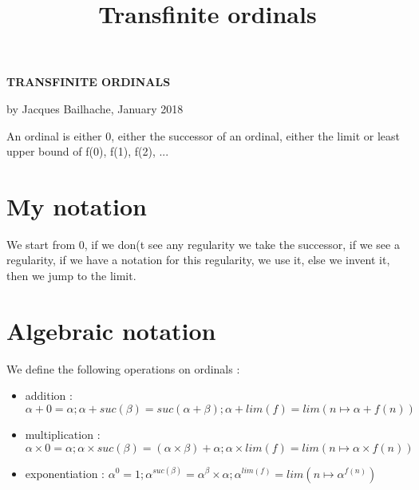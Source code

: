 \documentclass[8pt]{article}
\title{Transfinite ordinals}
\begin{document}
\setlength{\parindent}{0pt}

\vspace{-0.4cm}

\begin{center}
\textbf{TRANSFINITE ORDINALS}

by Jacques Bailhache, January 2018
\end{center}

\vspace{-0.2cm}

An ordinal is either 0, either the successor of an ordinal, either the limit or least upper bound of f(0), f(1), f(2), ...
\vspace{-0.7cm}

\section{My notation}
\vspace{-0.4cm}
We start from 0, if we don(t see any regularity we take the successor, if we see a regularity, if we have a notation for this regularity, we use it, else we invent it, then we jump to the limit.

\vspace{-0.6cm}

\section{Algebraic notation}
\vspace{-0.4cm}
We define the following operations on ordinals :
\vspace{-0.4cm}
\smallskip
\begin{itemize}
     \setlength{\itemsep}{1pt}
     \setlength{\parskip}{0pt}
     \setlength{\parsep}{0pt}
\item addition : \( \alpha+0=\alpha ; \alpha+suc(\beta)=suc(\alpha+\beta); \alpha+lim(f)=lim(n \mapsto \alpha+f(n)) \)
\vspace{-0.1cm}
\item multiplication : \( \alpha \times 0 = \alpha ; \alpha \times suc(\beta) = (\alpha \times \beta) + \alpha ; \alpha \times lim(f) = lim (n \mapsto \alpha \times f(n)) \)
\vspace{-0.1cm}
\item exponentiation : \( \alpha^0 = 1 ; \alpha^{suc(\beta)} = \alpha^\beta \times \alpha ; \alpha^{lim(f)} = lim (n \mapsto \alpha^{f(n)}) \)
\end{itemize}
\vspace{-0.8cm}
\end{document}
